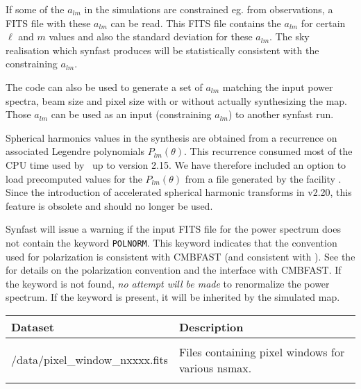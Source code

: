 \begin{codedescription}
{If some of the $a_{lm}$ in the simulations are constrained eg. from observations, a FITS file
with these $a_{lm}$ can be read. This FITS file contains 
the $a_{lm}$ for certain $\ell$ and $m$ values
and also the standard deviation for these $a_{lm}$. The sky
realisation which synfast produces will be statistically consistent
with the constraining $a_{lm}$.

The code can also be used
to generate a set of $a_{lm}$ matching the input power spectra, beam size and
pixel size with or without actually synthesizing the map. Those $a_{lm}$ can be
used as an input (constraining $a_{lm}$) to another synfast run.
\\
}
\end{codedescription}
%
\begin{cd_contd}
{
Spherical harmonics values in the synthesis are obtained from a
recurrence on associated Legendre polynomials $P_{lm}(\theta)$. 
This recurrence consumed most of the CPU time used by \thedocid\ up to version
2.15. We have therefore included an option to load precomputed values for the
$P_{lm}(\theta)$ from a file generated by the \healpix facility
. Since the introduction of accelerated spherical
harmonic transforms in \healpix v2.20, this feature is obsolete and should no
longer be used. 

Synfast will issue a warning if the input FITS file for the power spectrum does
not contain the keyword {\tt POLNORM}. This keyword indicates that the convention
used for polarization is consistent with CMBFAST (and consistent with ). See the 
for details on the
polarization convention and the interface with CMBFAST. If the
keyword is not found, {\em no attempt will be made} to renormalize the power
spectrum. 
If the keyword is present, it will be inherited by the simulated map.
}
\end{cd_contd}


\begin{datasets}
{
\begin{tabular}{p{0.3\hsize} p{0.35\hsize}} \hline  
  \textbf{Dataset} & \textbf{Description} \\ \hline
                   &                      \\ %
  /data/pixel\_window\_nxxxx.fits & Files containing pixel windows for
                   various nsmax.\\ 
                   &                      \\ \hline %
\end{tabular}
} 
\end{datasets}

